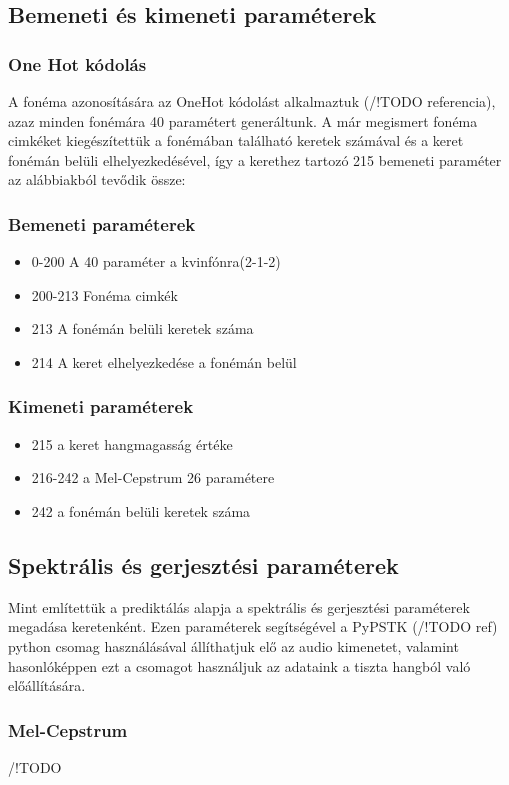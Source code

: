 \subsection{Bemeneti és kimeneti paraméterek}
\subsubsection{One Hot kódolás}
A fonéma azonosítására az OneHot kódolást alkalmaztuk (/!TODO referencia), azaz minden fonémára 40 paramétert generáltunk. A már megismert fonéma cimkéket kiegészítettük a fonémában található keretek számával és a keret fonémán belüli elhelyezkedésével, így a kerethez tartozó 215 bemeneti paraméter az alábbiakból tevődik össze:
\subsubsection{Bemeneti paraméterek}
\begin{itemize}
	\item 0-200 A 40 paraméter a kvinfónra(2-1-2)
	\item 200-213 Fonéma cimkék
	\item 213 A fonémán belüli keretek száma
	\item 214 A keret elhelyezkedése a fonémán belül
\end{itemize} 
\subsubsection{Kimeneti paraméterek}
\begin{itemize}
	\item 215 a keret hangmagasság értéke
	\item 216-242 a Mel-Cepstrum 26 paramétere
	\item 242 a fonémán belüli keretek száma
\end{itemize}
\subsection{Spektrális és gerjesztési paraméterek}
Mint említettük a prediktálás alapja a spektrális és gerjesztési paraméterek megadása keretenként. Ezen paraméterek segítségével a PyPSTK (/!TODO ref) python csomag használásával állíthatjuk elő az audio kimenetet, valamint hasonlóképpen ezt a csomagot használjuk az adataink a tiszta hangból való előállítására.
\subsubsection{Mel-Cepstrum}
/!TODO